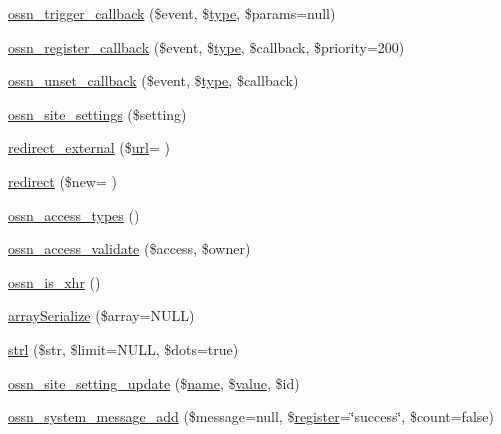 \begin{DoxyCompactItemize}
\item 
\hyperlink{ossn_8lib_8system_8php_ada703a9dc679546b72723502c3778dd4}{ossn\+\_\+trigger\+\_\+callback} (\$event, \$\hyperlink{_ossn_wall_2actions_2wall_2post_2group_8php_a2dc1bb4e1ed0029daa81ac0776b14b51}{type}, \$params=null)
\item 
\hyperlink{ossn_8lib_8system_8php_aa889eff76ab157a1ccb090ee5ba7d4a6}{ossn\+\_\+register\+\_\+callback} (\$event, \$\hyperlink{_ossn_wall_2actions_2wall_2post_2group_8php_a2dc1bb4e1ed0029daa81ac0776b14b51}{type}, \$callback, \$priority=200)
\item 
\hyperlink{ossn_8lib_8system_8php_afdd10cf8794b96dcd9d00faefec1e05e}{ossn\+\_\+unset\+\_\+callback} (\$event, \$\hyperlink{_ossn_wall_2actions_2wall_2post_2group_8php_a2dc1bb4e1ed0029daa81ac0776b14b51}{type}, \$callback)
\item 
\hyperlink{ossn_8lib_8system_8php_a610e2045b8a86c09f777b4d82e24e34c}{ossn\+\_\+site\+\_\+settings} (\$setting)
\item 
\hyperlink{ossn_8lib_8system_8php_aad82c3216b4ab4169458821e911deb24}{redirect\+\_\+external} (\$\hyperlink{ossn_8config_8site_8example_8php_ad643c3db2725019ef8130393d549e6db}{url}= \textquotesingle{}\textquotesingle{})
\item 
\hyperlink{ossn_8lib_8system_8php_a33cafdb93398ec540993c12c1daa0c48}{redirect} (\$new= \textquotesingle{}\textquotesingle{})
\item 
\hyperlink{ossn_8lib_8system_8php_a50097b88d4330fc1ffee074ecc910f96}{ossn\+\_\+access\+\_\+types} ()
\item 
\hyperlink{ossn_8lib_8system_8php_a63fc6692b2eea9edc7052ca6aa03fb4e}{ossn\+\_\+access\+\_\+validate} (\$access, \$owner)
\item 
\hyperlink{ossn_8lib_8system_8php_ac764e738f5c840432bbe4771e4fa27a7}{ossn\+\_\+is\+\_\+xhr} ()
\item 
\hyperlink{ossn_8lib_8system_8php_a0d372e465fe6284d28162ab894534e14}{array\+Serialize} (\$array=N\+U\+LL)
\item 
\hyperlink{ossn_8lib_8system_8php_ab8d187538f28c0038ecdc56a44a49d27}{strl} (\$str, \$limit=N\+U\+LL, \$dots=true)
\item 
\hyperlink{ossn_8lib_8system_8php_a28b4c6efe594ba1a6340e6373b11fde0}{ossn\+\_\+site\+\_\+setting\+\_\+update} (\$\hyperlink{user_8php_a765af5e9671743530143a6d3670fd9a6}{name}, \$\hyperlink{fullpage_2plugin_8min_8js_ac56c57897e10f699d124e0103921aa20}{value}, \$id)
\item 
\hyperlink{ossn_8lib_8system_8php_a801b79ef8f3df2ad2e401374666f2290}{ossn\+\_\+system\+\_\+message\+\_\+add} (\$message=null, \$\hyperlink{ossn_8lib_8views_8php_a8f6e4c183faf477ee38054dbc31e85c3}{register}=\char`\"{}success\char`\"{}, \$count=false)

\end{DoxyCompactItemize}
